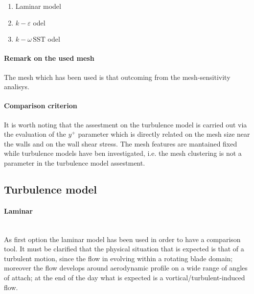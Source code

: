\documentclass[a4paper,12pt]{article}
\newcommand{\kepsilon}[1]{$k\!-\!\varepsilon $ }
\newcommand{\komegasst}[1]{$k\!-\!\omega \, \text{SST} $ }
\begin{document}
\begin{enumerate}
\item Laminar model
\item \kepsilon model
\item \komegasst model
\end{enumerate}

\paragraph{Remark on the used mesh}
The mesh which has been used is that outcoming from the mesh-sensitivity analisys.

\paragraph{Comparison criterion}
It is worth noting that the assestment on the turbulence model is carried out via the evaluation of the $y^+ $ parameter which is directly related on the mesh size near the walls and on the wall shear stress.
The mesh features are mantained fixed while turbulence models have ben investigated, i.e. the mesh clustering is not a parameter in the turbulence model assestment.


\subsection{Turbulence model}


\paragraph{Laminar}\mbox{}\\
As first option the laminar model has been used in order to have a comparison tool.
It must be clarified that the physical situation that is expected is that of a turbulent motion, since the flow in evolving within a rotating blade domain; moreover the flow develops around aerodynamic profile on a wide range of angles of attach; at the end of the day what is expected is a vortical/turbulent-induced flow.
 
\end{document}
